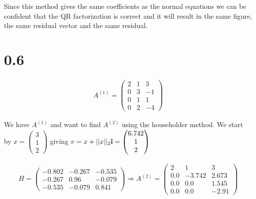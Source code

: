 \documentclass[a4paper]{article}
\newcommand{\ihat}{\boldsymbol{\hat{\textbf{\i}}}}
\begin{document}
Since this method gives the same coefficients as the normal equations we can be confident that the QR factorization is correct and it will result in the same figure, the same residual vector and the same residual. 

\section*{0.6}

\begin{align*}
    A^{(1)} = \begin{pmatrix}
        2 & 1 & 3 \\
        0 & 3 & -1\\
        0 & 1 & 1 \\
        0 & 2 & -4
    \end{pmatrix}
\end{align*}

We have $A^{(1)}$ and want to find $A^{(2)}$ using the householder method. We start by $x = \begin{pmatrix}
3 \\1\\2
\end{pmatrix}$ giving $v = x + ||x||_2 \ihat = \begin{pmatrix}
6.742 \\ 1 \\ 2
\end{pmatrix}$

\begin{align*}
    H = \begin{pmatrix}
        -0.802 & -0.267 & -0.535 \\
        -0.267 & 0.96 & -0.079 \\
        -0.535 & -0.079 & 0.841
    \end{pmatrix} \Rightarrow
    A^{(2)} = \begin{pmatrix}
        2 & 1 & 3 \\
        0.0 & -3.742 & 2.673 \\
        0.0 & 0.0 & 1.545 \\
        0.0 & 0.0 & -2.91
    \end{pmatrix}
\end{align*}
\end{document}
